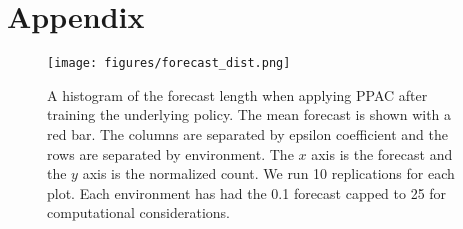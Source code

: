 \documentclass{article}
\begin{document}
\begin{enumerate}
    \end{enumerate}


    \appendix
    \section{Appendix}
    
            \begin{figure}[!h]
                \texttt{[image: figures/forecast\_dist.png]}
                \caption{A histogram of the forecast length when applying  PPAC after training the underlying policy. The mean forecast is shown with a red bar. The columns are separated by epsilon coefficient and the rows are separated by environment. The $x$ axis is the forecast and the $y$ axis is the normalized count. We run 10 replications for each plot. Each environment has had the 0.1 forecast capped to 25 for computational considerations.}
                \label{forecast-dist}
            \end{figure}
    
\end{document}
